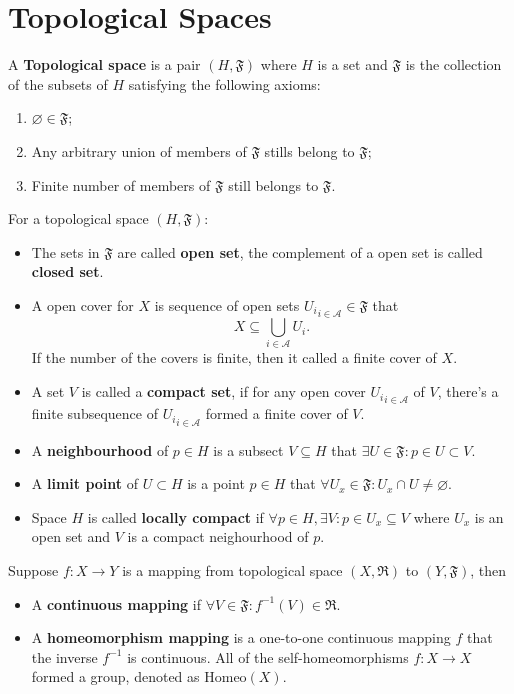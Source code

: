 \section{Topological Spaces}
\begin{definition}
A \textbf{Topological space} is a pair $(H,\mathfrak{F})$ where $H$ is a set and $\mathfrak{F}$ is the collection of the subsets of $H$ satisfying the following axioms:
\begin{enumerate}
\item $\varnothing\in\mathfrak{F}$;
\item Any arbitrary union of members of $\mathfrak{F}$ stills belong to $\mathfrak{F}$;
\item Finite number of members of $\mathfrak{F}$ still belongs to $\mathfrak{F}$.
\end{enumerate}
\end{definition}

\begin{definition}
For a topological space $(H,\mathfrak{F})$:
\begin{itemize}
\item The sets in $\mathfrak{F}$ are called \textbf{open set}, the complement of a open set is called \textbf{closed set}.
\item A open cover for $X$ is sequence of open sets ${U_i}_{i\in\mathcal{A}}\in\mathfrak{F}$ that
\begin{equation}
X\subseteq \bigcup_{i\in \mathcal{A}}U_i.
\end{equation}
If the number of the covers is finite, then it called a finite cover of $X$.
\item A set $V$ is called a \textbf{compact set}, if for any open cover ${U_i}_{i\in\mathcal{A}}$ of $V$, there's a finite subsequence of ${U_i}_{i\in\mathcal{A}}$ formed a finite cover of $V$. 
\item A \textbf{neighbourhood} of $p\in H$ is a subsect $V\subseteq H$ that $\exists U\in\mathfrak{F}:p\in U\subset V$.
\item A \textbf{limit point} of $U\subset H$ is a point $p\in H$ that $\forall U_x\in\mathfrak{F}: U_x\cap U\ne\varnothing$. 
\item Space $H$ is called \textbf{locally compact} if $\forall p\in H, \exists V:p\in U_x\subseteq V$ where $U_x$ is an open set and $V$ is a compact neighourhood of $p$.
\end{itemize}
\end{definition}

\begin{definition}
Suppose $f:X\to Y$ is a mapping from topological space $(X,\mathfrak{R})$ to $(Y,\mathfrak{F})$, then
\begin{itemize}
\item A \textbf{continuous mapping} if $\forall V\in \mathfrak{F}: f^{-1}(V)\in\mathfrak{R}$. 
\item A \textbf{homeomorphism mapping} is a one-to-one continuous mapping $f$ that the inverse $f^{-1}$ is continuous. All of the self-homeomorphisms $f:X\to X$ formed a group, denoted as $\text{Homeo}(X)$. 
\end{itemize}
\end{definition}

